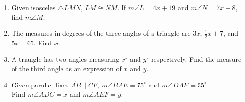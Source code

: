 \begin{enumerate}
\newpage
\item Given isosceles $\triangle LMN$, $\overline{LM} \cong \overline{NM}$. If $m\angle L=4x+19$ and $m\angle N=7x-8$, find $m\angle M$.
  \begin{flushright}
  \end{flushright} \vspace{2cm}

\item The measures in degrees of the three angles of a triangle are $3x$, $\frac{1}{2}x+7$, and $5x-65$. Find $x$. \vspace{3cm}

\item A triangle has two angles measuring $x^\circ$ and $y^\circ$ respectively. Find the measure of the third angle as an expression of $x$ and $y$. \vspace{3cm}

\item Given parallel lines $\overleftrightarrow{AB} \parallel \overleftrightarrow{CF}$, $m\angle BAE=75^\circ$ and $m\angle DAE=55^\circ$. \\[0.5cm]
  Find $m\angle ADC = x$ and $m\angle AEF = y$.
  \begin{flushright}
  \end{flushright}


\end{enumerate}
